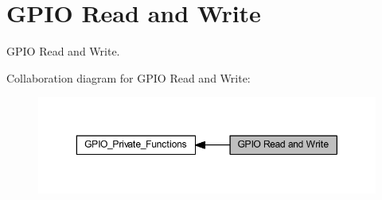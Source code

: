 \hypertarget{group___g_p_i_o___group2}{}\section{G\+P\+IO Read and Write}
\label{group___g_p_i_o___group2}


G\+P\+IO Read and Write.  


Collaboration diagram for G\+P\+IO Read and Write\+:\nopagebreak
\begin{figure}[H]
\begin{center}
\leavevmode
\includegraphics[width=350pt]{group___g_p_i_o___group2}
\end{center}
\end{figure}
